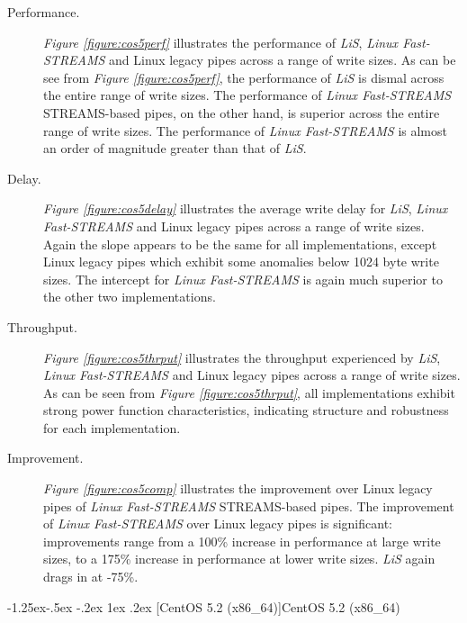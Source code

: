 \documentclass[letterpaper,final,notitlepage,twocolumn,10pt,twoside]{article}
\makeatletter
\renewcommand\subsubsection{\@startsection{subsubsection}{3}{\z@}%
                                     {-1.25ex\@plus -.5ex \@minus -.2ex}%
                                     {1ex \@plus .2ex}%
                                     {\normalfont\normalsize\bfseries}}
\makeatother
\begin{document}
\begin{description}

\item[Performance.]

\textit{Figure \ref{figure:cos5perf}}
illustrates the performance of \textsl{LiS}, \textsl{Linux Fast-STREAMS} and Linux legacy pipes
across a range of write sizes.  As can be see from \textit{Figure \ref{figure:cos5perf}}, the
performance of \textsl{LiS} is dismal across the entire range of write sizes.  The performance of
\textsl{Linux Fast-STREAMS} STREAMS-based pipes, on the other hand, is superior across the entire
range of write sizes.  The performance of \textsl{Linux Fast-STREAMS} is almost an order of
magnitude greater than that of \textsl{LiS}.

\item[Delay.]

\textit{Figure \ref{figure:cos5delay}}
illustrates the average write delay for \textsl{LiS}, \textsl{Linux Fast-STREAMS} and Linux legacy
pipes across a range of write sizes.  Again the slope appears to be the same for all
implementations, except Linux legacy pipes which exhibit some anomalies below 1024 byte write sizes.
The intercept for \textsl{Linux Fast-STREAMS} is again much superior to the other two
implementations.

\item[Throughput.]

\textit{Figure \ref{figure:cos5thrput}}
illustrates the throughput experienced by \textsl{LiS}, \textsl{Linux Fast-STREAMS} and Linux legacy
pipes across a range of write sizes.  As can be seen from \textit{Figure \ref{figure:cos5thrput}},
all implementations exhibit strong power function characteristics, indicating structure and
robustness for each implementation.

\item[Improvement.]

\textit{Figure \ref{figure:cos5comp}}
illustrates the improvement over Linux legacy pipes of \textsl{Linux Fast-STREAMS} STREAMS-based
pipes.  The improvement of \textsl{Linux Fast-STREAMS} over Linux legacy pipes is significant:
improvements range from a 100\% increase in performance at large write sizes, to a 175\% increase in
performance at lower write sizes.  \textsl{LiS} again drags in at -75\%.

\end{description}

\subsubsection[CentOS 5.2 (x86\_64)]{CentOS 5.2 (x86\_64)}
\end{document}
